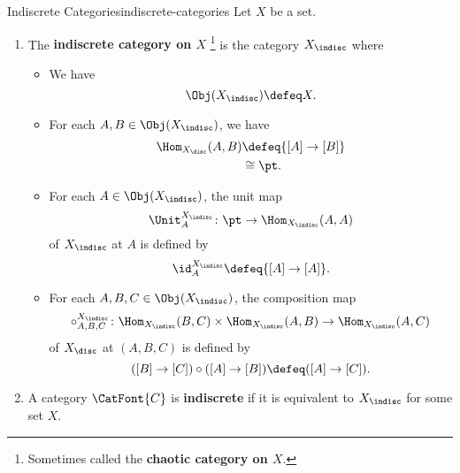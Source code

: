 \begin{definition}{Indiscrete Categories}{indiscrete-categories}%
    Let $X$ be a set.
    \begin{enumerate}
        \item\label{indiscrete-categories-the-indiscrete-category-on-a-set}The \textbf{indiscrete category on $X$}%
            \footnote{%
                Sometimes called the \textbf{chaotic category on $X$}.
                \par\vspace*{\TCBBoxCorrection}
            } %
            is the category $X_{\indisc}$ where
            \begin{itemize}
                \item{}We have
                    \[
                        \Obj(X_{\indisc})
                        \defeq
                        X.
                    \]%
                \item{}For each $A,B\in\Obj(X_{\indisc})$, we have
                    \begin{align*}
                        \Hom_{X_{\disc}}(A,B) &\defeq \{[A]\to[B]\}\\
                                              &\cong  \pt.
                    \end{align*}
                \item{}For each $A\in\Obj(X_{\indisc})$, the unit map
                    \[
                        \Unit^{X_{\indisc}}_{A}
                        \colon
                        \pt
                        \to
                        \Hom_{X_{\indisc}}(A,A)
                    \]%
                    of $X_{\indisc}$ at $A$ is defined by
                    \[
                        \id^{X_{\indisc}}_{A}
                        \defeq
                        \{[A]\to[A]\}.
                    \]%
                \item{}For each $A,B,C\in\Obj(X_{\indisc})$, the composition map
                    \[
                        \circ^{X_{\indisc}}_{A,B,C}
                        \colon
                        \Hom_{X_{\indisc}}(B,C)
                        \times
                        \Hom_{X_{\indisc}}(A,B)
                        \to
                        \Hom_{X_{\indisc}}(A,C)
                    \]%
                    of $X_{\disc}$ at $(A,B,C)$ is defined by
                    \[
                        ([B]\to[C])\circ([A]\to[B])
                        \defeq
                        ([A]\to[C]).
                    \]%
            \end{itemize}
        \item\label{indiscrete-categories-indiscrete-categories}A category $\CatFont{C}$ is \textbf{indiscrete} if it is equivalent to $X_{\indisc}$ for some set $X$.
    \end{enumerate}
\end{definition}
